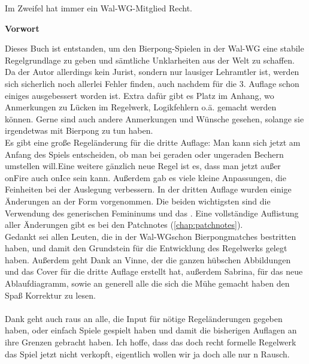 \documentclass[a5paper, 12pt]{book}
\begin{document}
\begin{center}
\vspace*{2.5cm}
\par
\smallskip
\large{Im Zweifel hat immer ein Wal-WG\texttrademark-Mitglied Recht.}
\end{center}
\restoregeometry
\pagebreak
\begin{Large} \textbf{Vorwort\\}
\end{Large}
Dieses Buch ist entstanden, um den Bierpong-Spielen in der Wal-WG eine stabile Regelgrundlage zu geben und sämtliche Unklarheiten aus der Welt zu schaffen. Da der Autor allerdings kein Jurist, sondern nur lausiger Lehramtler ist, werden sich sicherlich noch allerlei Fehler finden, auch nachdem für die 3. Auflage schon einiges ausgebessert worden ist. Extra dafür gibt es Platz im Anhang, wo Anmerkungen zu Lücken im Regelwerk, Logikfehlern o.ä. gemacht werden können. Gerne sind auch andere Anmerkungen und Wünsche gesehen, solange sie irgendetwas mit Bierpong zu tun haben.\\
Es gibt eine große Regeländerung für die dritte Auflage: Man kann sich jetzt am Anfang des Spiels entscheiden, ob man bei geraden oder ungeraden Bechern umstellen will.Eine weitere gänzlich neue Regel ist es, dass man jetzt außer onFire auch onIce sein kann. Außerdem gab es viele kleine Anpassungen, die Feinheiten bei der Auslegung verbessern.
In der dritten Auflage wurden einige Änderungen an der Form vorgenommen. Die beiden wichtigsten sind die Verwendung des generischen Femininums und das \texttrademark. Eine vollständige Auflistung aller Änderungen gibt es bei den Patchnotes (\ref{chap:patchnotes}).\\
Gedankt sei allen Leuten, die in der Wal-WG\texttrademark schon Bierpongmatches bestritten haben, und damit den Grundstein für die Entwicklung des Regelwerks gelegt haben. Außerdem geht Dank an Vinne, der die ganzen hübschen Abbildungen und das Cover für die dritte Auflage erstellt hat, außerdem Sabrina, für das neue Ablaufdiagramm, sowie an generell alle die sich die Mühe gemacht haben den Spaß Korrektur zu lesen.\\\\
Dank geht auch raus an alle, die Input für nötige Regeländerungen gegeben haben, oder einfach Spiele gespielt haben und damit die bisherigen Auflagen an ihre Grenzen gebracht haben.
Ich hoffe, dass das doch recht formelle Regelwerk das Spiel jetzt nicht verkopft, eigentlich wollen wir ja doch alle nur n Rausch.
\end{document}
